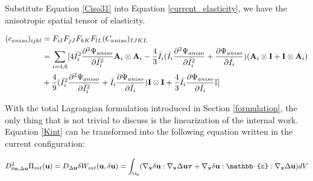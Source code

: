 Substitute Equation \ref{Ciso31} into Equation \ref{current_elasticity}, we have the anisotropic spatial tensor of elasticity.

\begin{equation} \label{spatial_ciso3}
\begin{split}
(c_{aniso})_{ijkl} &=  F_{iI}F_{jJ}F_{kK}F_{lL}(C_{aniso})_{IJKL} \\
&= 
 \sum_{i = 4, 6} [4{\bar{I}_i}^2\frac{\partial^2\Psi_{aniso}}{\partial{\bar{I}_i}^2} \bold{A}_{i} \otimes \bold{A}_{i} - \frac{4}{3}\bar{I}_i(\bar{I}_i\frac{\partial^2\Psi_{aniso}}{\partial{\bar{I}_i}^2} + \frac{\partial\Psi_{aniso}}{\partial{\bar{I}_i}})
 (\bold{A}_{i} \otimes \bold{I} + \bold{I} \otimes \bold{A}_i) \\
&+ \frac{4}{9}({\bar{I}_i}^2\frac{\partial^2\Psi_{aniso}}{\partial{\bar{I}_i}^2} + \bar{I}_i\frac{\partial\Psi_{aniso}}{\partial{\bar{I}_i}})\bold{I} \otimes \bold{I} 
+ \frac{4}{3}\bar{I}_i \frac{\partial\Psi_{aniso}}{\partial{\bar{I}_i}} \mathbb{I}]
\end{split}
\end{equation}

With the total Lagrangian formulation introduced in Section \ref{formulation}, the only thing that is not trivial to discuss is the linearization of the internal work. Equation \ref{Kint} can be transformed into the following equation written in the current configuration:

\begin{equation}
D^2_{\delta\bold{u}, \Delta\bold{u}}\Pi_{int}(\bold{u}) = D_{\Delta{\bold{u}}}\delta{W_{int}}(\bold{u}, \delta{\bold{u}}) = \int_{\Omega_0}(\nabla_{\bold{x}}\delta\bold{u} : \nabla_{\bold{x}}\Delta\bold{u}\boldsymbol{\tau} + \nabla_{\bold{x}}\delta{\bold{u}} : \mathbb{c} :  \nabla_{\bold{x}}\Delta\bold{u})dV
\end{equation}

